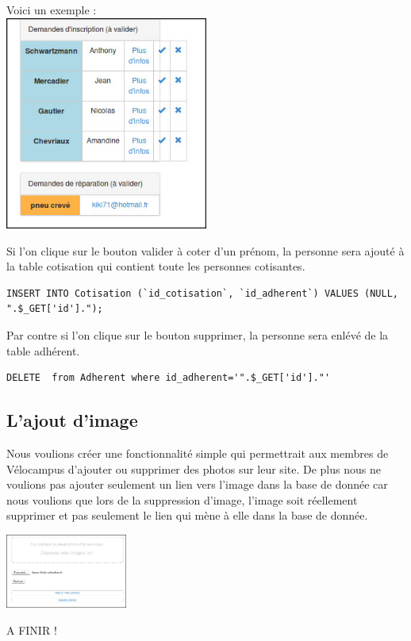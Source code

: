 \documentclass[11pt,a4paper,titlepage]{report}
\begin{document}
Voici un exemple :\\
\includegraphics[width=0.5\textwidth]{demande.jpg}~

Si l'on clique sur le bouton valider à coter d'un prénom, la personne sera ajouté à la table cotisation qui contient toute les personnes cotisantes.
\begin{verbatim}
INSERT INTO Cotisation (`id_cotisation`, `id_adherent`) VALUES (NULL, ".$_GET['id'].");
\end{verbatim} 
Par contre si l'on clique sur le bouton supprimer, la personne sera enlévé de la table adhérent.
\begin{verbatim}
DELETE  from Adherent where id_adherent='".$_GET['id']."'
\end{verbatim}

\subsection{L'ajout d'image}
Nous voulions créer une fonctionnalité simple qui permettrait aux membres de Vélocampus d'ajouter ou supprimer des photos sur leur site. De plus nous ne voulions pas ajouter seulement un lien vers l'image dans la base de donnée car nous voulions que lors de la suppression d'image, l'image soit réellement supprimer et pas seulement le lien qui mène à elle dans la base de donnée.
\begin{center}
\includegraphics[width=0.3\textwidth]{addImage.jpg}~
\end{center}

A FINIR ! 
\end{document}
